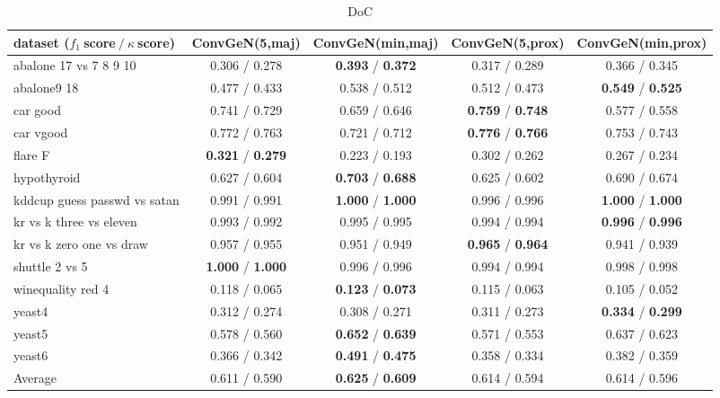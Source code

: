 \begin{table*}[ht]\scriptsize\caption{DoC}\label{tab:results:DoC:A}\centering\tabularnewline
\begin{tabular}{l|@{\hskip3pt}c@{\hskip3pt}|@{\hskip3pt}c@{\hskip3pt}|@{\hskip3pt}c@{\hskip3pt}|@{\hskip3pt}c@{\hskip3pt}}\hline
\textbf{dataset ($f_1~$score$~/~\kappa~$score)} & \textbf{ConvGeN(5,maj)} & \textbf{ConvGeN(min,maj)} & \textbf{ConvGeN(5,prox)} & \textbf{ConvGeN(min,prox)}
\tabularnewline
\hline
abalone 17 vs 7 8 9 10 &  0.306  /  0.278  &  \textbf{0.393}  /  \textbf{0.372}  &  0.317  /  0.289  &  0.366  /  0.345 
\tabularnewline
abalone9 18 &  0.477  /  0.433  &  0.538  /  0.512  &  0.512  /  0.473  &  \textbf{0.549}  /  \textbf{0.525} 
\tabularnewline
car good &  0.741  /  0.729  &  0.659  /  0.646  &  \textbf{0.759}  /  \textbf{0.748}  &  0.577  /  0.558 
\tabularnewline
car vgood &  0.772  /  0.763  &  0.721  /  0.712  &  \textbf{0.776}  /  \textbf{0.766}  &  0.753  /  0.743 
\tabularnewline
flare F &  \textbf{0.321}  /  \textbf{0.279}  &  0.223  /  0.193  &  0.302  /  0.262  &  0.267  /  0.234 
\tabularnewline
hypothyroid &  0.627  /  0.604  &  \textbf{0.703}  /  \textbf{0.688}  &  0.625  /  0.602  &  0.690  /  0.674 
\tabularnewline
kddcup guess passwd vs satan &  0.991  /  0.991  &  \textbf{1.000}  /  \textbf{1.000}  &  0.996  /  0.996  &  \textbf{1.000}  /  \textbf{1.000} 
\tabularnewline
kr vs k three vs eleven &  0.993  /  0.992  &  0.995  /  0.995  &  0.994  /  0.994  &  \textbf{0.996}  /  \textbf{0.996} 
\tabularnewline
kr vs k zero one vs draw &  0.957  /  0.955  &  0.951  /  0.949  &  \textbf{0.965}  /  \textbf{0.964}  &  0.941  /  0.939 
\tabularnewline
shuttle 2 vs 5 &  \textbf{1.000}  /  \textbf{1.000}  &  0.996  /  0.996  &  0.994  /  0.994  &  0.998  /  0.998 
\tabularnewline
winequality red 4 &  0.118  /  0.065  &  \textbf{0.123}  /  \textbf{0.073}  &  0.115  /  0.063  &  0.105  /  0.052 
\tabularnewline
yeast4 &  0.312  /  0.274  &  0.308  /  0.271  &  0.311  /  0.273  &  \textbf{0.334}  /  \textbf{0.299} 
\tabularnewline
yeast5 &  0.578  /  0.560  &  \textbf{0.652}  /  \textbf{0.639}  &  0.571  /  0.553  &  0.637  /  0.623 
\tabularnewline
yeast6 &  0.366  /  0.342  &  \textbf{0.491}  /  \textbf{0.475}  &  0.358  /  0.334  &  0.382  /  0.359 
\tabularnewline
\hline Average &  0.611  /  0.590  &  \textbf{0.625}  /  \textbf{0.609}  &  0.614  /  0.594  &  0.614  /  0.596 
\tabularnewline
\hline\end{tabular}\end{table*}

